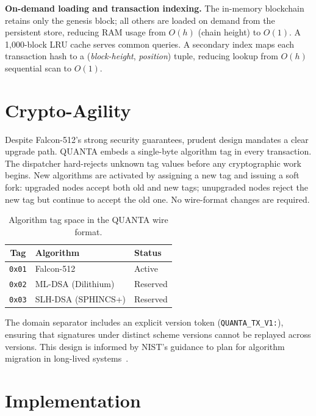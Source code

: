 \documentclass[11pt,a4paper]{article}
\begin{document}
\textbf{On-demand loading and transaction indexing.}
The in-memory blockchain retains only the genesis block; all others are
loaded on demand from the persistent store, reducing RAM usage from $O(h)$
(chain height) to $O(1)$. A 1,000-block LRU cache serves common queries.
A secondary index maps each transaction hash to a
(\textit{block-height}, \textit{position}) tuple, reducing lookup from
$O(h)$ sequential scan to $O(1)$.

\section{Crypto-Agility}
\label{sec:agility}

Despite Falcon-512's strong security guarantees, prudent design mandates a
clear upgrade path. QUANTA embeds a single-byte algorithm tag in every
transaction. The dispatcher hard-rejects unknown tag values before any
cryptographic work begins. New algorithms are activated by assigning a new
tag and issuing a soft fork: upgraded nodes accept both old and new tags;
unupgraded nodes reject the new tag but continue to accept the old one.
No wire-format changes are required.

\begin{table}[h]
\centering
\begin{tabular}{@{}cll@{}}
\toprule
\textbf{Tag} & \textbf{Algorithm} & \textbf{Status} \\
\midrule
\texttt{0x01} & Falcon-512           & Active \\
\texttt{0x02} & ML-DSA (Dilithium)   & Reserved \\
\texttt{0x03} & SLH-DSA (SPHINCS+)   & Reserved \\
\bottomrule
\end{tabular}
\caption{Algorithm tag space in the QUANTA wire format.}
\end{table}

The domain separator includes an explicit version token
(\texttt{QUANTA\_TX\_V1:}), ensuring that signatures under distinct scheme
versions cannot be replayed across versions. This design is informed by
NIST's guidance to plan for algorithm migration in long-lived
systems~\cite{fips206}.

\section{Implementation}
\end{document}

